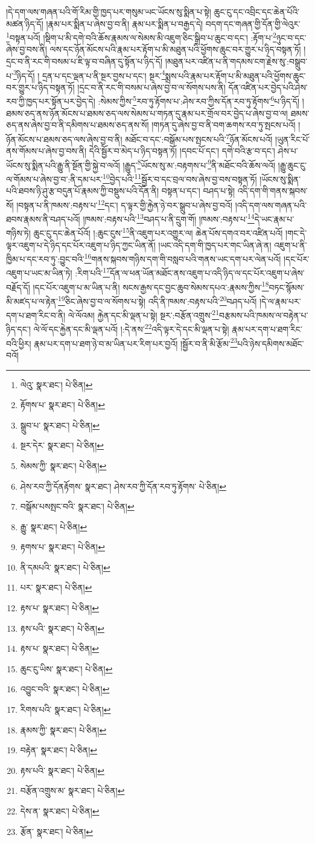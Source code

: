 །དེ་དག་ལས་གཞན་པའི་གོ་རིམ་གྱི་ཁྱད་པར་གསུམ་ཡང་ཡོངས་སུ་སྨིན་པ་སྟེ། ཆུང་ངུ་དང་འབྲིང་དང་ཆེན་པོའི་མཚན་ཉིད་དོ། །རྣམ་པར་སྨིན་པ་ཞེས་བྱ་བ་ནི། རྣམ་པར་སྨིན་པ་བརྒྱད་དེ། བདག་དང་གཞན་གྱི་དོན་གྱི་ལེའུར་\footnote{ལེའུ་  སྣར་ཐང་།  པེ་ཅིན། }བསྟན་པའོ། །སྡིག་པ་མི་དགེ་བའི་ཆོས་རྣམས་ལ་སེམས་མི་འཇུག་ཅིང་སྒྲིབ་པ་ཆུང་བ་དང་། :རྟོག་པ་\footnote{རྟོགས་པ་  སྣར་ཐང་།  པེ་ཅིན། }ཉུང་བ་དང་ཞེས་བྱ་བས་ནི། ལས་དང་ཉོན་མོངས་པའི་རྣམ་པར་རྟོག་པ་མི་མཐུན་པའི་ཕྱོགས་ཆུང་བར་གྱུར་པ་ཉིད་བསྟན་ཏོ། །དྲང་བ་ནི་རང་གི་བསམ་པ་ཇི་ལྟ་བ་བཞིན་དུ་སྟོན་པ་ཉིད་དོ། །མཐུན་པར་འཛིན་པ་ནི་གདམས་ངག་རྗེས་སུ་:བསྒྲུབ་པ་\footnote{སྒྲུབ་པ་  སྣར་ཐང་།  པེ་ཅིན། }ཉིད་དོ། །
དྲན་པ་དང་ལྡན་པ་ནི་སྔར་བྱས་པ་དང་། སྔར་\footnote{སྔར་དེར་  སྣར་ཐང་།  པེ་ཅིན། }སྨྲས་པའི་རྣམ་པར་རྟོག་པ་མི་མཐུན་པའི་ཕྱོགས་ཆུང་བར་གྱུར་པ་ཉིད་བསྟན་ཏོ། །དྲང་བ་ནི་རང་གི་བསམ་པ་ཞེས་བྱ་བ་ལ་སོགས་པས་ནི། དོན་འཛིན་པར་བྱེད་པའི་ཤེས་རབ་ཀྱི་ཁྱད་པར་སྟོན་པར་བྱེད་དེ། :སེམས་ཀྱིས་\footnote{སེམས་ཀྱི་  སྣར་ཐང་།  པེ་ཅིན། }རབ་ཏུ་རྟོགས་པ་:ཤེས་རབ་ཀྱིས་དོན་རབ་ཏུ་རྟོགས་\footnote{ཤེས་རབ་ཀྱི་དོནརྟོགས་  སྣར་ཐང་། ཤེས་རབ་ཀྱི་དོན་རབ་ཏུ་རྟོགས་  པེ་ཅིན། }པ་ཉིད་དོ། །ཐམས་ཅད་ནས་ཉོན་མོངས་པ་ཐམས་ཅད་ལས་སེམས་པ་གཏན་དུ་རྣམ་པར་གྲོལ་བར་བྱེད་པ་ཞེས་བྱ་བ་ལ། ཐམས་ཅད་ནས་ཞེས་བྱ་བ་ནི་དམིགས་པ་ཐམས་ཅད་ནས་སོ། །གཏན་དུ་ཞེས་བྱ་བ་ནི་བག་ཆགས་རབ་ཏུ་སྤངས་པའོ། །ཉོན་མོངས་པ་ཐམས་ཅད་ལས་ཞེས་བྱ་བ་ནི། མཐོང་བ་དང་:བསྒོམ་པས་སྤངས་པའི་\footnote{བསྒོམ་པསསྤང་བའི་  སྣར་ཐང་།  པེ་ཅིན། }ཉོན་མོངས་པའོ། །ཡུན་རིང་པོ་ནས་གོམས་པ་ཞེས་བྱ་བས་ནི། དེའི་སྦྱོར་བ་མེད་པ་ཉིད་བསྟན་ཏོ། །དབང་པོ་དང་། དགེ་བའི་རྩ་བ་དང་། ཤེས་པ་ཡོངས་སུ་སྨིན་པའི་རྒྱུ་ནི་སྔོན་གྱི་སྐྱེ་བ་ལའོ། །རྒྱུད་\footnote{རྒྱུ་  སྣར་ཐང་།  པེ་ཅིན། }ཡོངས་སུ་མ་:བརྟགས་པ་\footnote{རྟགས་པ་  སྣར་ཐང་།  པེ་ཅིན། }ནི་མཐོང་བའི་ཆོས་ལའོ། །རྒྱུ་ཆུང་ངུ་ལ་གོམས་པ་ཞེས་བྱ་བ་:ནི་དམ་པར་\footnote{ནི་དམཔའི་  སྣར་ཐང་།  པེ་ཅིན། }བྱེད་པའི་\footnote{པར་  སྣར་ཐང་།  པེ་ཅིན། }སྦྱོར་བ་དང་བྲལ་བས་ཞེས་བྱ་བས་བསྟན་ཏོ། །ཡོངས་སུ་སྨིན་པའི་ཐབས་ཉི་ཤུ་རྩ་བདུན་པོ་རྣམས་ཀྱི་བསྡུས་པའི་དོན་ནི། བསྟན་པ་དང་། བཤད་པ་སྟེ། འདི་དག་གི་གནས་སྐབས་སོ། །བསྟན་པ་ནི་ཁམས་:བརྟས་པ་\footnote{རྟས་པ་  སྣར་ཐང་།  པེ་ཅིན། }དང་། ད་ལྟར་གྱི་རྐྱེན་ཉེ་བར་སྒྲུབ་པ་ཞེས་བྱ་བའོ། །འདི་དག་ལས་གཞན་པའི་ཐབས་རྣམས་ནི་བཤད་པའོ། །ཁམས་:བརྟས་པའི་\footnote{རྟས་པའི་  སྣར་ཐང་།  པེ་ཅིན། }བཤད་པ་ནི་དྲུག་གོ། །ཁམས་:བརྟས་པ་\footnote{རྟས་པ་  སྣར་ཐང་།  པེ་ཅིན། }དེ་ཡང་རྣམ་པ་གཉིས་ཏེ། ཆུང་ངུ་དང་ཆེན་པོའོ། །:ཆུང་ངུས་\footnote{ཆུང་ངུ་ཡིས་  སྣར་ཐང་།  པེ་ཅིན། }ནི་འཇུག་པར་འགྱུར་ལ། ཆེན་པོས་དགའ་བར་འཛིན་པའོ། །གང་དེ་ལྟར་འཇུག་པ་དེ་ཉིད་དང་པོར་འཇུག་པ་ཉིད་ཀྱང་ཡིན་ནོ། །ཡང་འདི་དག་གི་ཁྱད་པར་གང་ཡིན་ཞེ་ན། འཇུག་པ་ནི་ཁྱིམ་པ་དང་རབ་ཏུ་:བྱུང་བའི་\footnote{འབྱུང་བའི་  སྣར་ཐང་།  པེ་ཅིན། }གནས་སྐབས་གཉིས་དག་གི་བསླབ་པའི་གནས་ཡང་དག་པར་ལེན་པའོ། །དང་པོར་འཇུག་པ་ཡང་མ་ཡིན་ཏེ། :རིག་པའི་\footnote{རིགས་པའི་  སྣར་ཐང་།  པེ་ཅིན། }དོན་ལ་ཕན་ཡོན་མཐོང་ནས་འཇུག་པ་འདི་ཉིད་ལ་དང་པོར་འཇུག་པ་ཞེས་བརྗོད་དོ། །དང་པོར་འཇུག་པ་མ་ཡིན་པ་ནི། སངས་རྒྱས་དང་བྱང་ཆུབ་སེམས་དཔའ་:རྣམས་ཀྱིས་\footnote{རྣམས་ཀྱི་  སྣར་ཐང་།  པེ་ཅིན། }བཏང་སྙོམས་མི་མཛད་པ་ལ་རྟེན་\footnote{བརྟེན་  སྣར་ཐང་།  པེ་ཅིན། }ཅིང་ཞེས་བྱ་བ་ལ་སོགས་པ་སྟེ། འདི་ནི་ཁམས་:བརྟས་པའི་\footnote{རྟས་པའི་  སྣར་ཐང་།  པེ་ཅིན། }བཤད་པའོ། །དེ་ལ་རྣམ་པར་དག་པ་ཐག་རིང་བ་ནི། ལེ་ལོའམ། རྐྱེན་དང་མི་ལྡན་པ་སྟེ། སྔར་:བརྩོན་འགྲུས་\footnote{བརྩོན་འགྲུས་མ་  སྣར་ཐང་།  པེ་ཅིན། }བརྩམས་པའི་ཁམས་ལ་བརྟེན་པ་ཉིད་དང་། ལེ་ལོ་དང་རྐྱེན་དང་མི་ལྡན་པའོ། །:དེ་ནས་\footnote{དེས་ན་  སྣར་ཐང་།  པེ་ཅིན། }འདི་ལྟར་དེ་དང་མི་ལྡན་པ་སྟེ། རྣམ་པར་དག་པ་ཐག་རིང་བའི་ཕྱིར། རྣམ་པར་དག་པ་ཐག་ཉེ་བ་མ་ཡིན་པར་རིག་པར་བྱའོ། །སྦྱོར་བ་ནི་མི་རྩོམ་\footnote{རྩོན་  སྣར་ཐང་།  པེ་ཅིན། }པའི་ཉེས་དམིགས་མཐོང་བའོ། 